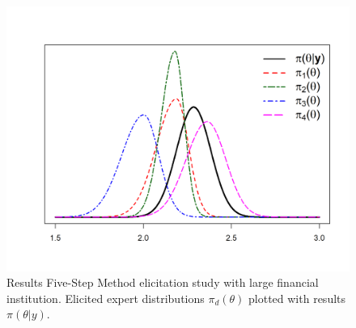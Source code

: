 \documentclass[openright,titlepage,12pt,a4paper]{book}
\begin{document}
\begin{figure}

{\centering \includegraphics[width=0.9\linewidth]{figures/chapter_2/Figure_5a} 

}

\caption{Results Five-Step Method elicitation study with large financial institution. Elicited expert distributions $\pi_d(\theta)$ plotted with results $\pi(\theta|y)$.}\label{fig:ch02fig5}
\end{figure}
\end{document}
